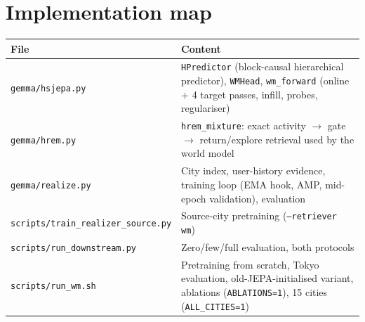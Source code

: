 \documentclass[10.5pt]{article}
\begin{document}
\section{Implementation map}
\begin{center}\small
\begin{tabularx}{\linewidth}{lX}
\toprule
File & Content \\
\midrule
\texttt{gemma/hsjepa.py} & \texttt{HPredictor} (block-causal hierarchical predictor), \texttt{WMHead}, \texttt{wm\_forward} (online + 4 target passes, infill, probes, regulariser) \\
\texttt{gemma/hrem.py} & \texttt{hrem\_mixture}: exact activity $\rightarrow$ gate $\rightarrow$ return/explore retrieval used by the world model \\
\texttt{gemma/realize.py} & City index, user-history evidence, training loop (EMA hook, AMP, mid-epoch validation), evaluation \\
\texttt{scripts/train\_realizer\_source.py} & Source-city pretraining (\texttt{--retriever wm}) \\
\texttt{scripts/run\_downstream.py} & Zero/few/full evaluation, both protocols \\
\texttt{scripts/run\_wm.sh} & Pretraining from scratch, Tokyo evaluation, old-JEPA-initialised variant, ablations (\texttt{ABLATIONS=1}), 15 cities (\texttt{ALL\_CITIES=1}) \\
\bottomrule
\end{tabularx}
\end{center}
\end{document}

